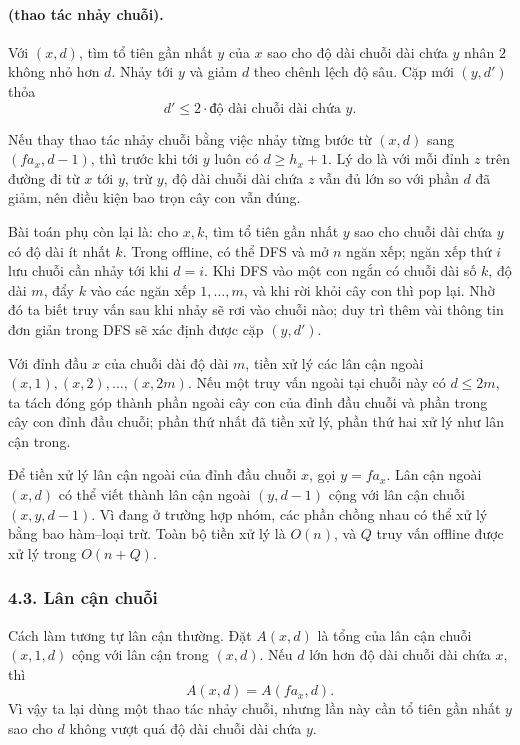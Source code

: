 \documentclass[11pt]{article}
\begin{document}
\paragraph{ (thao tác nhảy chuỗi).}
Với \((x,d)\), tìm tổ tiên gần nhất \(y\) của \(x\) sao cho độ dài chuỗi dài
chứa \(y\) nhân \(2\) không nhỏ hơn \(d\). Nhảy tới \(y\) và giảm \(d\) theo
chênh lệch độ sâu. Cặp mới \((y,d')\) thỏa
\[
  d'\le 2\cdot \text{độ dài chuỗi dài chứa } y.
\]

Nếu thay thao tác nhảy chuỗi bằng việc nhảy từng bước từ \((x,d)\) sang
\((fa_x,d-1)\), thì trước khi tới \(y\) luôn có \(d\ge h_x+1\). Lý do là với
mỗi đỉnh \(z\) trên đường đi từ \(x\) tới \(y\), trừ \(y\), độ dài chuỗi dài
chứa \(z\) vẫn đủ lớn so với phần \(d\) đã giảm, nên điều kiện bao trọn cây
con vẫn đúng.

Bài toán phụ còn lại là: cho \(x,k\), tìm tổ tiên gần nhất \(y\) sao cho chuỗi
dài chứa \(y\) có độ dài ít nhất \(k\). Trong offline, có thể DFS và mở \(n\)
ngăn xếp; ngăn xếp thứ \(i\) lưu chuỗi cần nhảy tới khi \(d=i\). Khi DFS vào
một con ngắn có chuỗi dài số \(k\), độ dài \(m\), đẩy \(k\) vào các ngăn xếp
\(1,\ldots,m\), và khi rời khỏi cây con thì pop lại. Nhờ đó ta biết truy vấn
sau khi nhảy sẽ rơi vào chuỗi nào; duy trì thêm vài thông tin đơn giản trong
DFS sẽ xác định được cặp \((y,d')\).

Với đỉnh đầu \(x\) của chuỗi dài độ dài \(m\), tiền xử lý các lân cận ngoài
\((x,1),(x,2),\ldots,(x,2m)\). Nếu một truy vấn ngoài tại chuỗi này có
\(d\le 2m\), ta tách đóng góp thành phần ngoài cây con của đỉnh đầu chuỗi và
phần trong cây con đỉnh đầu chuỗi; phần thứ nhất đã tiền xử lý, phần thứ hai
xử lý như lân cận trong.

Để tiền xử lý lân cận ngoài của đỉnh đầu chuỗi \(x\), gọi \(y=fa_x\). Lân cận
ngoài \((x,d)\) có thể viết thành lân cận ngoài \((y,d-1)\) cộng với lân cận
chuỗi \((x,y,d-1)\). Vì đang ở trường hợp nhóm, các phần chồng nhau có thể xử
lý bằng bao hàm--loại trừ. Toàn bộ tiền xử lý là \(O(n)\), và \(Q\) truy vấn
offline được xử lý trong \(O(n+Q)\).

\subsubsection*{4.3. Lân cận chuỗi}

Cách làm tương tự lân cận thường. Đặt \(A(x,d)\) là tổng của lân cận chuỗi
\((x,1,d)\) cộng với lân cận trong \((x,d)\). Nếu \(d\) lớn hơn độ dài chuỗi
dài chứa \(x\), thì
\[
  A(x,d)=A(fa_x,d).
\]
Vì vậy ta lại dùng một thao tác nhảy chuỗi, nhưng lần này cần tổ tiên gần nhất
\(y\) sao cho \(d\) không vượt quá độ dài chuỗi dài chứa \(y\).
\end{document}
